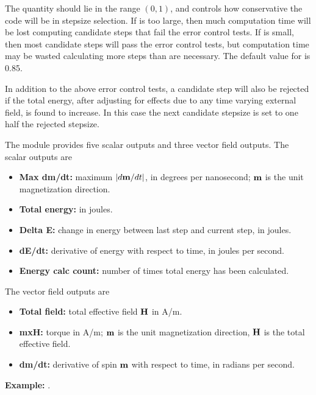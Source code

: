 \begin{description}
The  quantity should lie in the range $(0,1)$, and controls
how conservative the code will be in stepsize selection.  If 
is too large, then much computation time will be lost computing
candidate steps that fail the error control tests.  If  is
small, then most candidate steps will pass the error control tests, but
computation time may be wasted calculating more steps than are
necessary.  The default value for  is 0.85.

In addition to the above error control tests, a candidate step will also
be rejected if the total energy, after adjusting for effects due to any
time varying external field, is found to increase.  In this case the
next candidate stepsize is set to one half the rejected stepsize.

The  module provides five scalar outputs and three
vector field outputs.  The scalar outputs are
\begin{itemize}
\item \textbf{Max dm/dt:} maximum $|d\textbf{m}/dt|$, in degrees per
   nanosecond; $\textbf{m}$ is the unit magnetization direction.
\item \textbf{Total energy:} in joules.
\item \textbf{Delta E:} change in energy between last step and current
   step, in joules.
\item \textbf{dE/dt:} derivative of energy with respect to time, in
   joules per second.
\item \textbf{Energy calc count:} number of times total energy has been
   calculated.
\end{itemize}

The vector field outputs are
\begin{itemize}
\item \textbf{Total field:} total effective field $\textbf{H}$ in A/m.
\item \textbf{mxH:} torque in A/m; $\textbf{m}$ is the unit magnetization
   direction, $\textbf{H}$ is the total effective field.
\item \textbf{dm/dt:} derivative of spin $\textbf{m}$ with respect to time, in
   radians per second.
\end{itemize}

\textbf{Example:} .


\end{description}
